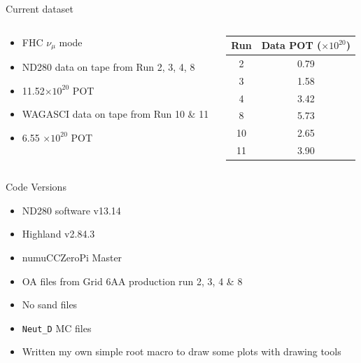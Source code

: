 \documentclass{beamer}
\begin{document}
\begin{frame}{Current dataset}

\begin{columns}[c]
\begin{column}{.5\textwidth}
\begin{itemize}
    \item FHC ${\nu}_{\mu}$ mode 
    \item ND280 data on tape from Run 2, 3, 4, 8
    \item 11.52$\times10^{20}$ POT
    \item WAGASCI data on tape from Run 10 \& 11
    \item 6.55 $\times10^{20}$ POT
\end{itemize}    
\end{column}
\begin{column}{.5\textwidth}

\begin{table}[htp]
\begin{ruledtabular}
\begin{tabular}{c|c}
\hline
\hline 
Run & Data POT ($\times10^{20}$)\\
	\hline
 2 & 0.79 \\
 3 & 1.58 \\
 4 & 3.42 \\
8 & 5.73 \\
 10 & 2.65 \\
 11 & 3.90 \\ 
\hline
\hline 
\end{tabular}
\end{ruledtabular}
\end{table}

\end{column}
\end{columns}

\end{frame}

\begin{frame}{Code Versions}
\begin{itemize}
    \item ND280 software v13.14
    \item Highland v2.84.3
    \item numuCCZeroPi Master
    \item OA files from Grid 6AA production run 2, 3, 4 \& 8 
    \item No sand files
    \item \texttt{Neut\_D} MC files
    \item Written my own simple root macro to draw some plots with drawing tools
   \end{itemize}
\end{frame}
\end{document}
